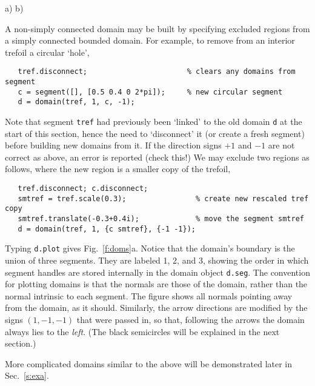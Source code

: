 \bfi %
a)
b)
\efi

A non-simply connected domain may be built by specifying excluded
regions from a simply connected bounded domain. For example,
to remove from an interior trefoil a circular `hole',
\begin{verbatim}
   tref.disconnect;                       % clears any domains from segment
   c = segment([], [0.5 0.4 0 2*pi]);     % new circular segment
   d = domain(tref, 1, c, -1);
\end{verbatim}
Note that segment {\tt tref} had previously
been `linked' to the old domain {\tt d}
at the start of this section, hence the need to `disconnect' it
(or create a fresh segment) before
building new domains from it. 
If the direction signs $+1$ and $-1$ are not correct as above, an
error is reported (check this!)
We may exclude two regions as follows, where the new region is a smaller copy
of the trefoil,
\begin{verbatim}
   tref.disconnect; c.disconnect;
   smtref = tref.scale(0.3);                % create new rescaled tref copy
   smtref.translate(-0.3+0.4i);             % move the segment smtref
   d = domain(tref, 1, {c smtref}, {-1 -1});
\end{verbatim}
Typing {\tt d.plot} gives Fig.~\ref{f:doms}a. Notice that
the domain's boundary is the union of three segments. They are labeled
1, 2, and 3, showing the order in which segment handles
are stored internally in the domain object {\tt d.seg}.
The convention for plotting domains is that the normals
are those of the domain, rather than the normal intrinsic to each segment.
The figure shows all normals pointing away from the domain, as it should.
Similarly, the arrow directions are modified by the signs $(1,-1,-1)$ that
were passed in, so that, following the arrows the domain always lies to
the {\em left}. (The black semicircles will be explained in the next section.)

More complicated domains similar to the above will be demonstrated later in
Sec.~\ref{s:exa}.

\vspace{10ex}


